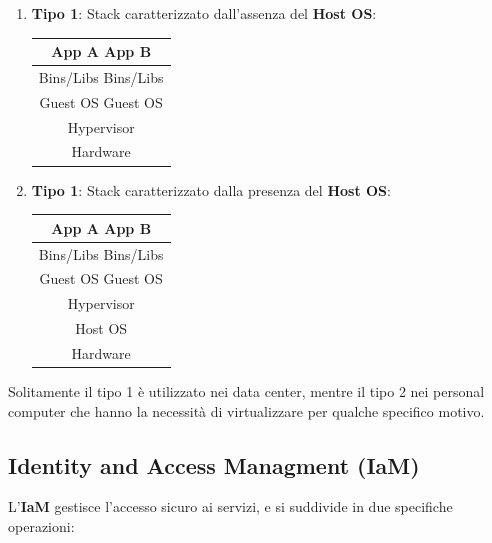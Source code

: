 \documentclass{article}
\begin{document}
\begin{enumerate}
    \item \textbf{Tipo 1}: Stack caratterizzato dall'assenza del \textbf{Host OS}:
    \begin{center}
        \begin{tabular}{ |c| } %
        \hline
        App A \:\: \vline \:\: App B \\
        \hline
        Bins/Libs \:  \vline \:  Bins/Libs \\
        \hline
        Guest OS \:  \vline \:  Guest OS \\        
         \hline
         Hypervisor \\ 
         \hline
         Hardware \\
         \hline
        \end{tabular}
    \end{center}

    \item \textbf{Tipo 1}: Stack caratterizzato dalla presenza del \textbf{Host OS}:
    \begin{center}
        \begin{tabular}{ |c| } %
        \hline
        App A \:\: \vline \:\: App B \\
        \hline
        Bins/Libs \:  \vline \:  Bins/Libs \\
        \hline
        Guest OS \:  \vline \:  Guest OS \\        
         \hline
         Hypervisor \\ 
         \hline
         Host OS \\
         \hline
         Hardware \\
         \hline
        \end{tabular}
    \end{center}
\end{enumerate}

Solitamente il tipo 1 è utilizzato nei data center, mentre il tipo 2 nei personal computer che hanno la necessità di virtualizzare per qualche specifico motivo.

\newpage

\subsection{Identity and Access Managment (IaM)}

L'\textbf{IaM} gestisce l'accesso sicuro ai servizi, e si suddivide in due specifiche operazioni:
\end{document}
